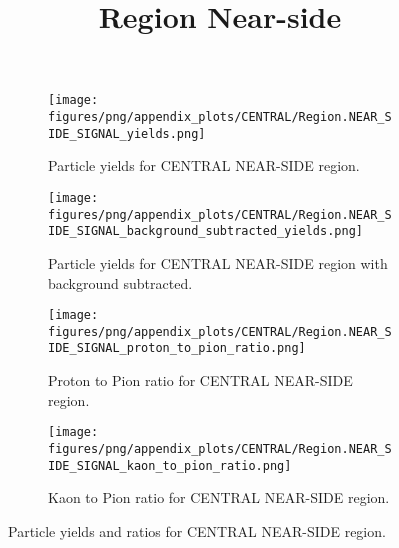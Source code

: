                 \begin{figure}[H]
                    \title{Region Near-side}
                    \begin{subfigure}[b]{0.5\textwidth}
                        \centering
                        \texttt{[image: figures/png/appendix\_plots/CENTRAL/Region.NEAR\_SIDE\_SIGNAL\_yields.png]}
                        \caption{Particle yields for CENTRAL NEAR-SIDE region.}
                        \label{fig:appendix_CENTRAL_NEAR_SIDE_SIGNAL_Inclusive_Yields}
                    \end{subfigure}
                    \begin{subfigure}[b]{0.5\textwidth}
                        \centering
                        \texttt{[image: figures/png/appendix\_plots/CENTRAL/Region.NEAR\_SIDE\_SIGNAL\_background\_subtracted\_yields.png]}
                        \caption{Particle yields for CENTRAL NEAR-SIDE region with background subtracted.}
                        \label{fig:appendix_CENTRAL_NEAR_SIDE_SIGNAL_Inclusive_Yields_Background_Subtracted}
                    \end{subfigure}
                    \begin{subfigure}[b]{0.5\textwidth}
                        \centering
                        \texttt{[image: figures/png/appendix\_plots/CENTRAL/Region.NEAR\_SIDE\_SIGNAL\_proton\_to\_pion\_ratio.png]}
                        \caption{Proton to Pion ratio for CENTRAL NEAR-SIDE region.}
                        \label{fig:appendix_CENTRAL_NEAR_SIDE_SIGNAL_Proton_to_Pion_Ratio}
                    \end{subfigure}
                    \begin{subfigure}[b]{0.5\textwidth}
                        \centering
                        \texttt{[image: figures/png/appendix\_plots/CENTRAL/Region.NEAR\_SIDE\_SIGNAL\_kaon\_to\_pion\_ratio.png]}
                        \caption{Kaon to Pion ratio for CENTRAL NEAR-SIDE region.}
                        \label{fig:appendix_CENTRAL_NEAR_SIDE_SIGNAL_Kaon_to_Pion_Ratio}
                    \end{subfigure}
                    \caption{Particle yields and ratios for CENTRAL NEAR-SIDE region.}
                    \label{fig:appendix_CENTRAL_NEAR_SIDE_SIGNAL_Inclusive_Yields_and_Ratios}
                \end{figure}
